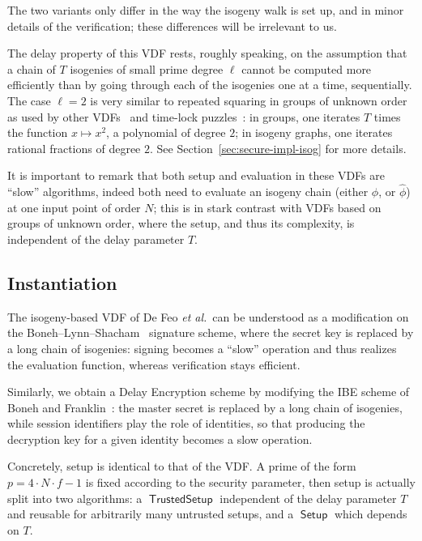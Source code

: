 \documentclass{llncs}
\DeclareMathOperator{\Setup}{\mathsf{Setup}}
\DeclareMathOperator{\TSetup}{\mathsf{TrustedSetup}}
\begin{document}
The two variants only differ in the way the isogeny walk is set up,
and in minor details of the verification; these differences will be
irrelevant to us.

The delay property of this VDF rests, roughly speaking, on the
assumption that a chain of $T$ isogenies of small prime degree $\ell$
cannot be computed more efficiently than by going through each of the
isogenies one at a time, sequentially. %
The case $\ell=2$ is very similar to repeated squaring in groups of
unknown order as used by other VDFs~\cite{Wesolowski,Pietrzak} and
time-lock puzzles~\cite{TLP}: in groups, one iterates $T$ times the
function $x\mapsto x^2$, a polynomial of degree $2$; in isogeny graphs, one
iterates rational fractions of degree $2$. %
See Section~\ref{sec:secure-impl-isog} for more details.

It is important to remark that both setup and evaluation in these VDFs
are ``slow'' algorithms, indeed both need to evaluate an isogeny chain
(either $\phi$, or $\hat\phi$) at one input point of order $N$; this
is in stark contrast with VDFs based on groups of unknown order, where
the setup, and thus its complexity, is independent of the delay
parameter $T$.


\subsection{Instantiation}

The isogeny-based VDF of De Feo \emph{et al.}\ can be understood as a
modification on the Boneh--Lynn--Shacham~\cite{boneh+lynn+shacham04}
signature scheme, where the secret key is replaced by a long chain of
isogenies: signing becomes a ``slow'' operation and thus realizes the
evaluation function, whereas verification stays efficient.

Similarly, we obtain a Delay Encryption scheme by modifying the IBE
scheme of Boneh and Franklin~\cite{doi:10.1137/S0097539701398521}: the
master secret is replaced by a long chain of isogenies, while session
identifiers play the role of identities, so that producing the
decryption key for a given identity becomes a slow operation.

Concretely, setup is identical to that of the VDF. %
A prime of the form $p=4\cdot N\cdot f - 1$ is fixed according to the
security parameter, then setup is actually split into two algorithms:
a $\TSetup$ independent of the delay parameter $T$ and reusable for
arbitrarily many untrusted setups, and a $\Setup$ which depends on
$T$.
\end{document}
